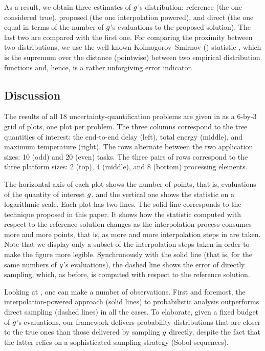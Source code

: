 As a result, we obtain three estimates of $g$'s distribution: reference (the
one considered true), proposed (the one interpolation powered), and direct (the
one equal in terms of the number of $g$'s evaluations to the proposed
solution). The last two are compared with the first one. For comparing the
proximity between two distributions, we use the well-known Kolmogorov--Smirnov
() statistic \cite{rao2009}, which is the supremum over the distance
(pointwise) between two empirical distribution functions and, hence, is a rather
unforgiving error indicator.


\subsection{Discussion}
The results of all 18 uncertainty-quantification problems are given in
 as a 6-by-3 grid of plots, one plot per problem. The three
columns correspond to the tree quantities of interest: the end-to-end delay
(left), total energy (middle), and maximum temperature (right). The rows
alternate between the two application sizes: 10 (odd) and 20 (even) tasks. The
three pairs of rows correspond to the three platform sizes: 2 (top), 4 (middle),
and 8 (bottom) processing elements.

The horizontal axis of each plot shows the number of points, that is,
evaluations of the quantity of interest $g$, and the vertical one shows the
 statistic on a logarithmic scale. Each plot has two lines. The solid
line corresponds to the technique proposed in this paper. It shows how the
 statistic computed with respect to the reference solution changes as the
interpolation process consumes more and more points, that is, as more and more
interpolation steps in  are taken. Note that we display only
a subset of the interpolation steps taken in order to make the figure more
legible. Synchronously with the solid line (that is, for the same numbers of
$g$'s evaluations), the dashed line shows the error of directly sampling,
which, as before, is computed with respect to the reference solution.

Looking at , one can make a number of observations. First and
foremost, the interpolation-powered approach (solid lines) to probabilistic
analysis outperforms direct sampling (dashed lines) in all the cases. To
elaborate, given a fixed budget of $g$'s evaluations, our framework delivers
probability distributions that are closer to the true ones than those delivered
by sampling $g$ directly, despite the fact that the latter relies on a
sophisticated sampling strategy (Sobol sequences).

